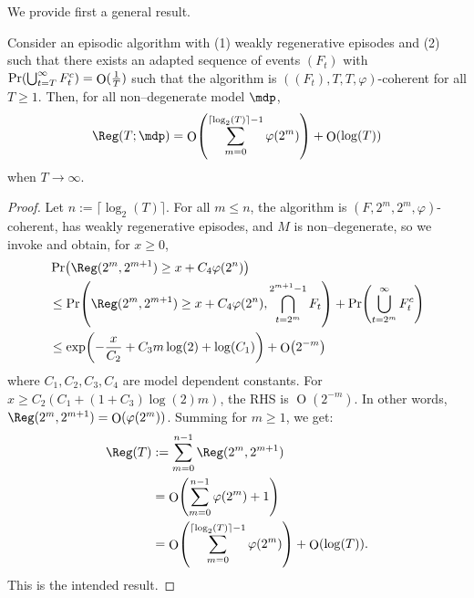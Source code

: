 \documentclass[preprint,cleveref,12pt]{colt2025}
\DeclarePairedDelimiter{\parens}{(}{)}	%
\DeclareMathOperator*{\OH}{\mathrm{O}}
\def\model{\mdp}
\begin{document}
    We provide first a general result. 

    \begin{theorem}
    \label{theorem_general_model_dependent_regret}
        Consider an episodic algorithm with {\upshape (1)} weakly regenerative episodes and {\upshape (2)} such that there exists an adapted sequence of events $(F_t)$ with $\Pr\parens{\bigcup_{t=T}^\infty F_t^c} = \OH(\frac 1T)$ such that the algorithm is $((F_t), T, T, \varphi)$-coherent for all $T \ge 1$.
        Then, for all non--degenerate model $\model$, 
        \begin{equation}
            \Reg(T; \model)
            =
            \OH \parens*{\sum_{m=0}^{\lceil \log_2(T) \rceil -1} \varphi(2^m)} + \OH(\log(T))
        \end{equation}
        when $T \to \infty$. 
    \end{theorem}

    \begin{proof}
        Let $n := \lceil \log_2(T) \rceil$. 
        For all $m \le n$, the algorithm is $(F, 2^m, 2^m, \varphi)$-coherent, has weakly regenerative episodes, and $M$ is non--degenerate, so we invoke  and obtain, for $x \ge 0$,
        \begin{align*}
            & 
            \Pr \parens*{
                \Reg(2^m, 2^{m+1})
                \ge
                x + C_4 \varphi(2^n)
            }
            \\
            & \le
            \Pr \parens*{
                \Reg(2^m, 2^{m+1})
                \ge
                x + C_4 \varphi(2^n),
                \bigcap_{t=2^m}^{2^{m+1}-1} F_t
            }
            +
            \Pr \parens*{
                \bigcup_{t=2^m}^{\infty} F_t^c
            }
            \\
            & \le
            \exp\parens*{
                - \frac{x}{C_2} + C_3 m \log(2) + \log(C_1)
            } + \OH \parens*{2^{-m}}
        \end{align*}
        where $C_1, C_2, C_3, C_4$ are model dependent constants. 
        For $x \ge C_2(C_1 + (1 + C_3) \log(2) m)$, the RHS is $\OH(2^{-m})$. 
        In other words, $\Reg(2^m, 2^{m+1}) = \OH(\varphi(2^m))$.
        Summing for $m \ge 1$, we get:
        \begin{align*}
            \Reg(T)
            & :=
            \sum_{m=0}^{n-1}
            \Reg(2^m, 2^{m+1})
            \\
            & =
            \OH \parens*{\sum_{m=0}^{n-1} \varphi(2^m) + 1}
            \\
            & =
            \OH \parens*{\sum_{m=0}^{\lceil \log_2(T) \rceil -1} \varphi(2^m)} + \OH(\log(T)).
        \end{align*}
        This is the intended result.
    \end{proof}
\end{document}
